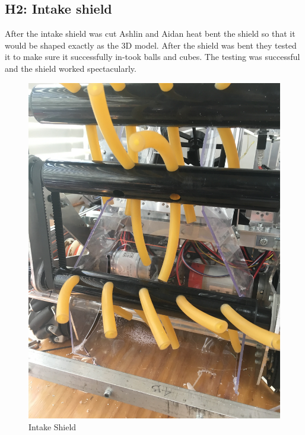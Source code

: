 \documentclass{article}
\begin{document}
\subsection{H2: Intake shield}

After the intake shield was cut Ashlin and Aidan heat bent the shield so that it would be shaped exactly as the 3D model. After the shield was bent they tested it to make sure it successfully in-took balls and cubes. The testing was successful and the shield worked  spectacularly.

\begin{figure}
    \centering
    \includegraphics[width=.6\textwidth, angle=270]{10_11-05/images/intake_shield.JPG}
    \caption{Intake Shield}
    \label{fig:Intake Shield}
\end{figure}
\end{document}
